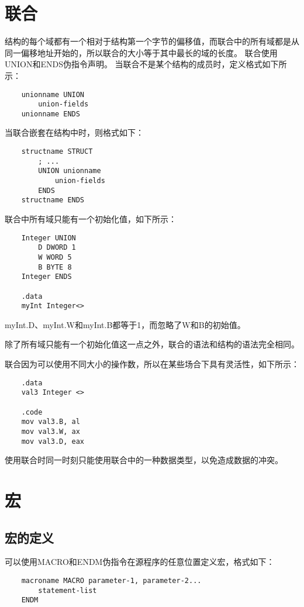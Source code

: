 \documentclass[a4paper,left=2.5cm,right=2.5cm,11pt]{article}
\begin{document}
\section{联合}
	结构的每个域都有一个相对于结构第一个字节的偏移值，而联合中的所有域都是从同一偏移地址开始的，所以联合的大小等于其中最长的域的长度。
	联合使用UNION和ENDS伪指令声明。
	当联合不是某个结构的成员时，定义格式如下所示：
	\begin{lstlisting}
	unionname UNION
		union-fields
	unionname ENDS
	\end{lstlisting}

	当联合嵌套在结构中时，则格式如下：
	\begin{lstlisting}
	structname STRUCT
		; ...
		UNION unionname
			union-fields
		ENDS
	structname ENDS
	\end{lstlisting}

	联合中所有域只能有一个初始化值，如下所示：
	\begin{lstlisting}
	Integer UNION
		D DWORD 1
		W WORD 5
		B BYTE 8
	Integer ENDS

	.data
	myInt Integer<>
	\end{lstlisting}

	myInt.D、myInt.W和myInt.B都等于1，而忽略了W和B的初始值。\par

	除了所有域只能有一个初始化值这一点之外，联合的语法和结构的语法完全相同。\par

	联合因为可以使用不同大小的操作数，所以在某些场合下具有灵活性，如下所示：
	\begin{lstlisting}
	.data
	val3 Integer <>

	.code
	mov val3.B, al
	mov val3.W, ax
	mov val3.D, eax
	\end{lstlisting}

	使用联合时同一时刻只能使用联合中的一种数据类型，以免造成数据的冲突。

\section{宏}
\subsection{宏的定义}
	可以使用MACRO和ENDM伪指令在源程序的任意位置定义宏，格式如下：
	\begin{lstlisting}
	macroname MACRO parameter-1, parameter-2...
		statement-list
	ENDM
	\end{lstlisting}
\end{document}
